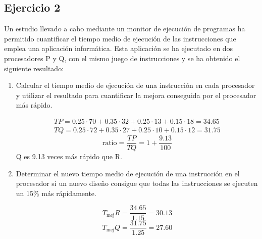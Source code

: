 \subsection{Ejercicio 2}
\noindent
Un estudio llevado a cabo mediante un monitor de ejecución de programas ha permitido cuantificar el tiempo medio de ejecución de las instrucciones que emplea una aplicación informática. Esta aplicación se ha ejecutado en dos procesadores P y Q, con el mismo juego de instrucciones y se ha obtenido el siguiente resultado:
\begin{table}[H]
\centering
{}
\end{table}
\begin{enumerate}
    \item Calcular el tiempo medio de ejecución de una instrucción en cada procesador y utilizar el resultado para cuantificar la mejora conseguida por el procesador más rápido.
\begin{tcolorbox}[colback=white,colframe=cyan!50!black,fonttitle=\bfseries]
\[\left.\begin{array}{ll}
TP=0.25\cdot 70+0.35\cdot32+0.25\cdot 13+0.15\cdot 18=34.65\\
TQ=0.25\cdot 72+0.35\cdot 27+0.25\cdot 10+0.15\cdot 12=31.75
\end{array}\right.
\]
\[
\text{ratio}=\dfrac{TP}{TQ}=1+\dfrac{9.13}{100}
\]
Q es 9.13 veces más rápido que R.
\end{tcolorbox}    
    \item Determinar el nuevo tiempo medio de ejecución de una instrucción en el procesador si un nuevo diseño consigue que todas las instrucciones se ejecuten un 15\% más rápidamente.
\begin{tcolorbox}[colback=white,colframe=cyan!50!black,fonttitle=\bfseries]
\[
T_{\text{mej}}R=\dfrac{34.65}{1.15}=30.13
\]
\[
T_{\text{mej}}Q=\dfrac{31.75}{1.25}=27.60
\]
\end{tcolorbox}    
\end{enumerate}
